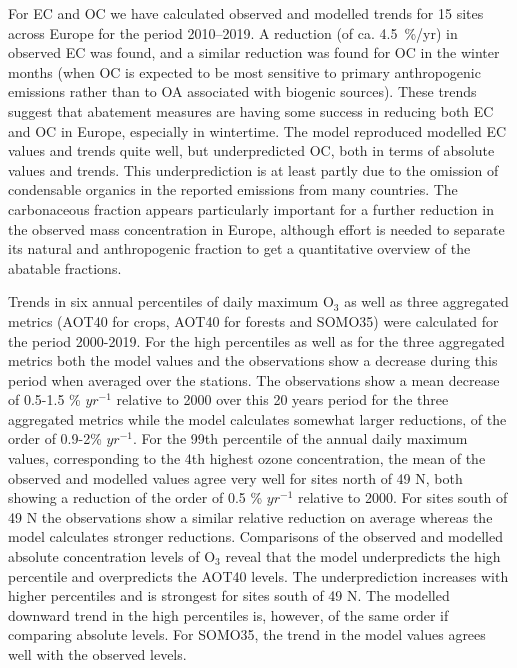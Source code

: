 

For EC and OC we have calculated observed and modelled trends for 15 sites across Europe for the period 2010--2019. A reduction (of ca. 4.5~\%/yr) in observed EC was found, and a similar reduction was found for OC in the winter months (when OC is expected to be most sensitive to primary anthropogenic emissions rather than to OA associated with biogenic sources). These trends suggest that abatement measures are having some success in reducing both EC and OC in Europe, especially in wintertime.  The model reproduced modelled EC values and trends quite well, but underpredicted OC, both in terms of absolute values and trends. This underprediction is at least partly due to the omission of condensable organics in the reported emissions from many countries. 
%
The carbonaceous fraction appears particularly important for a
further reduction in the observed \pmfine mass concentration in Europe,
although effort is needed to separate its natural and anthropogenic
fraction to get a quantitative overview of the abatable fractions.


Trends in six annual percentiles of daily maximum O$_3$ as well as three aggregated metrics (AOT40 for crops, AOT40 for forests and SOMO35) were calculated for the period 2000-2019. For the high percentiles as well as for the three aggregated metrics both the model values and the observations show a decrease during this period when averaged over the stations. The observations show a mean decrease of 0.5-1.5 \% $yr^{-1}$ relative to 2000 over this 20 years period for the three aggregated metrics while the model calculates somewhat larger reductions, of the order of 0.9-2\% $yr^{-1}$. For the 99th percentile of the annual daily maximum values, corresponding to the 4th highest ozone concentration, the mean of the observed and modelled values agree very well for sites north of 49 \degrees N, both showing a reduction of the order of 0.5  \% $yr^{-1}$ relative to 2000. For sites south of 49 \degrees N the observations show a similar relative reduction on average whereas the model calculates stronger reductions. Comparisons of the observed and modelled absolute concentration levels of O$_3$ reveal that the model underpredicts the high percentile and overpredicts the AOT40 levels. The underprediction increases with higher percentiles and is strongest for sites south of 49 \degrees N. The modelled downward trend in the high percentiles is, however, of the same order if comparing absolute levels. For SOMO35, the trend in the model values agrees well with the observed levels.

